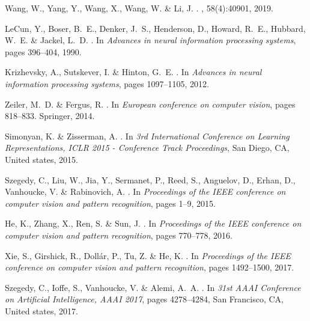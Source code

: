 \documentclass[review]{cvpr}
\begin{document}
{\begin{thebibliography}{10}
Wang, W., Yang, Y., Wang, X., Wang, W. \&  Li, J.
.
, 58(4):40901, 2019.


LeCun, Y., Boser, B.~E., Denker, J.~S., Henderson, D., Howard, R.~E., Hubbard,
  W.~E. \&  Jackel, L.~D.
.
\newblock In {\em Advances in neural information processing systems}, pages
  396--404, 1990.


Krizhevsky, A., Sutskever, I. \&  Hinton, G.~E.
.
\newblock In {\em Advances in neural information processing systems}, pages
  1097--1105, 2012.


Zeiler, M.~D. \&  Fergus, R.
.
\newblock In {\em European conference on computer vision}, pages 818--833.
  Springer, 2014.


Simonyan, K. \&  Zisserman, A.
.
\newblock In {\em 3rd International Conference on Learning Representations,
  ICLR 2015 - Conference Track Proceedings}, San Diego, CA, United states,
  2015.


Szegedy, C., Liu, W., Jia, Y., Sermanet, P., Reed, S., Anguelov, D., Erhan, D.,
  Vanhoucke, V. \&  Rabinovich, A.
.
\newblock In {\em Proceedings of the IEEE conference on computer vision and
  pattern recognition}, pages 1--9, 2015.


He, K., Zhang, X., Ren, S. \&  Sun, J.
.
\newblock In {\em Proceedings of the IEEE conference on computer vision and
  pattern recognition}, pages 770--778, 2016.


Xie, S., Girshick, R., Doll{\'{a}}r, P., Tu, Z. \&  He, K.
.
\newblock In {\em Proceedings of the IEEE conference on computer vision and
  pattern recognition}, pages 1492--1500, 2017.



Szegedy, C., Ioffe, S., Vanhoucke, V. \&  Alemi, A.~A.
.
\newblock In {\em 31st AAAI Conference on Artificial Intelligence, AAAI 2017},
  pages 4278--4284, San Francisco, CA, United states, 2017.



\end{thebibliography}}
\end{document}

